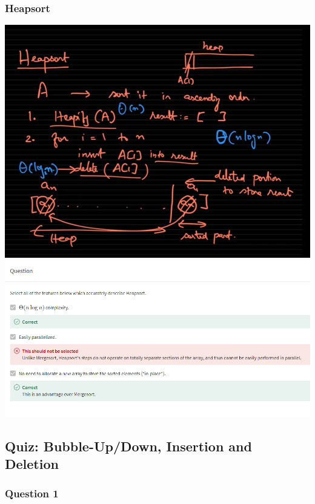 \documentclass{article}
\begin{document}
\subsubsection{Heapsort}

\includegraphics[width=\textwidth]{heapsort.png}
\includegraphics[width=\textwidth]{questionofheapsort.png}


\subsection{Quiz: Bubble-Up/Down, Insertion and Deletion}

\subsubsection{Question 1}
\end{document}
